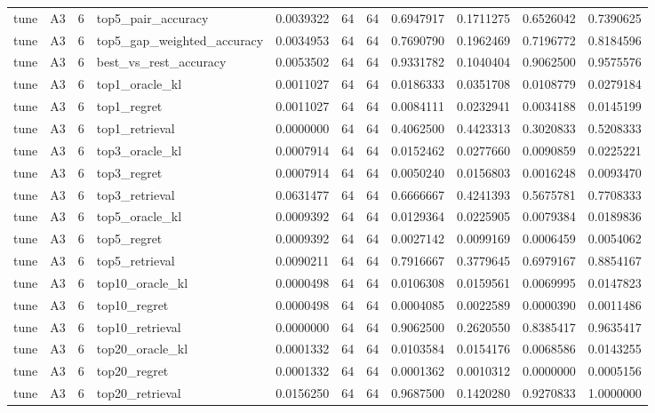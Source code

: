 \begin{tabular}{llrlrrrrrrr}
tune & A3 & 6 & top5_pair_accuracy & 0.0039322 & 64 & 64 & 0.6947917 & 0.1711275 & 0.6526042 & 0.7390625 \\
tune & A3 & 6 & top5_gap_weighted_accuracy & 0.0034953 & 64 & 64 & 0.7690790 & 0.1962469 & 0.7196772 & 0.8184596 \\
tune & A3 & 6 & best_vs_rest_accuracy & 0.0053502 & 64 & 64 & 0.9331782 & 0.1040404 & 0.9062500 & 0.9575576 \\
tune & A3 & 6 & top1_oracle_kl & 0.0011027 & 64 & 64 & 0.0186333 & 0.0351708 & 0.0108779 & 0.0279184 \\
tune & A3 & 6 & top1_regret & 0.0011027 & 64 & 64 & 0.0084111 & 0.0232941 & 0.0034188 & 0.0145199 \\
tune & A3 & 6 & top1_retrieval & 0.0000000 & 64 & 64 & 0.4062500 & 0.4423313 & 0.3020833 & 0.5208333 \\
tune & A3 & 6 & top3_oracle_kl & 0.0007914 & 64 & 64 & 0.0152462 & 0.0277660 & 0.0090859 & 0.0225221 \\
tune & A3 & 6 & top3_regret & 0.0007914 & 64 & 64 & 0.0050240 & 0.0156803 & 0.0016248 & 0.0093470 \\
tune & A3 & 6 & top3_retrieval & 0.0631477 & 64 & 64 & 0.6666667 & 0.4241393 & 0.5675781 & 0.7708333 \\
tune & A3 & 6 & top5_oracle_kl & 0.0009392 & 64 & 64 & 0.0129364 & 0.0225905 & 0.0079384 & 0.0189836 \\
tune & A3 & 6 & top5_regret & 0.0009392 & 64 & 64 & 0.0027142 & 0.0099169 & 0.0006459 & 0.0054062 \\
tune & A3 & 6 & top5_retrieval & 0.0090211 & 64 & 64 & 0.7916667 & 0.3779645 & 0.6979167 & 0.8854167 \\
tune & A3 & 6 & top10_oracle_kl & 0.0000498 & 64 & 64 & 0.0106308 & 0.0159561 & 0.0069995 & 0.0147823 \\
tune & A3 & 6 & top10_regret & 0.0000498 & 64 & 64 & 0.0004085 & 0.0022589 & 0.0000390 & 0.0011486 \\
tune & A3 & 6 & top10_retrieval & 0.0000000 & 64 & 64 & 0.9062500 & 0.2620550 & 0.8385417 & 0.9635417 \\
tune & A3 & 6 & top20_oracle_kl & 0.0001332 & 64 & 64 & 0.0103584 & 0.0154176 & 0.0068586 & 0.0143255 \\
tune & A3 & 6 & top20_regret & 0.0001332 & 64 & 64 & 0.0001362 & 0.0010312 & 0.0000000 & 0.0005156 \\
tune & A3 & 6 & top20_retrieval & 0.0156250 & 64 & 64 & 0.9687500 & 0.1420280 & 0.9270833 & 1.0000000 \\

\end{tabular}
